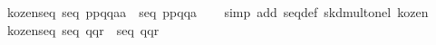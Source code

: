 \begin{isabellebody}
\ kozen{}{}seq{}\ {}seq\ {}p{}{}{}p{}{}{}q{}{}{}{}q{}{}{}{}a{}{}a{}{}\ {}\ seq\ {}p{}{}{}p{}{}{}q{}{}{}{}q{}{}{}{}a{}{}{}\isanewline
%
\isadelimproof
\ \ %
\endisadelimproof
%
\isatagproof
{}\isamarkupfalse%
\ {}simp\ add{}\ seq{}def\ skd{}mult{}onel\ kozen{}{}%
\endisatagproof
{\isafoldproof}%
%
\isadelimproof
\isanewline
%
\endisadelimproof
\isanewline
{}\isamarkupfalse%
\ kozen{}{}seq{}\ {}seq\ {}q{}{}{}{}q{}{}{}{}r{}{}{}\ {}\ seq\ {}q{}{}{}{}q{}{}{}{}r{}{}{}{}\isanewline
%
\isadelimproof
%
\endisadelimproof
%
\isatagproof
{}\isamarkupfalse%
\ {}\isanewline
\ \ \isamarkupfalse%

\end{isabellebody}

